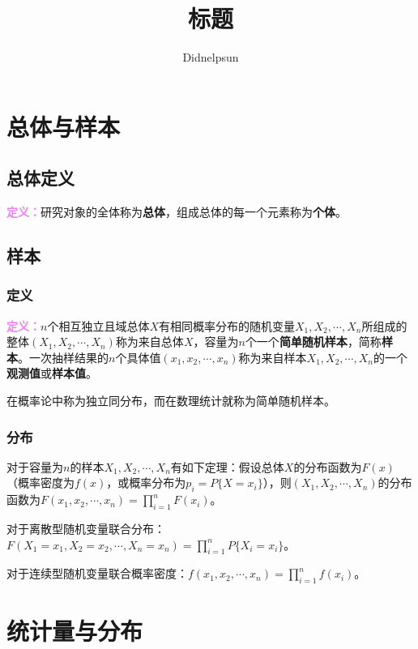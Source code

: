 \documentclass[UTF8, 12pt]{ctexart}
\author{Didnelpsun}
\title{标题}
\date{}
\begin{document}
\maketitle
\pagestyle{empty}
\thispagestyle{empty}
\tableofcontents
\thispagestyle{empty}
\newpage
\pagestyle{plain}
\setcounter{page}{1}
\section{总体与样本}

\subsection{总体定义}

\textcolor{violet}{\textbf{定义：}}研究对象的全体称为\textbf{总体}，组成总体的每一个元素称为\textbf{个体}。

\subsection{样本}

\subsubsection{定义}

\textcolor{violet}{\textbf{定义：}}$n$个相互独立且域总体$X$有相同概率分布的随机变量$X_1,X_2,\cdots,X_n$所组成的整体$(X_1,X_2,\cdots,X_n)$称为来自总体$X$，容量为$n$个一个\textbf{简单随机样本}，简称\textbf{样本}。一次抽样结果的$n$个具体值$(x_1,x_2,\cdots,x_n)$称为来自样本$X_1,X_2,\cdots,X_n$的一个\textbf{观测值}或\textbf{样本值}。

在概率论中称为独立同分布，而在数理统计就称为简单随机样本。

\subsubsection{分布}

对于容量为$n$的样本$X_1,X_2,\cdots,X_n$有如下定理：假设总体$X$的分布函数为$F(x)$（概率密度为$f(x)$，或概率分布为$p_i=P\{X=x_i\}$），则$(X_1,X_2,\cdots,X_n)$的分布函数为$F(x_1,x_2,\cdots,x_n)=\prod\limits_{i=1}^nF(x_i)$。

对于离散型随机变量联合分布：$F(X_1=x_1,X_2=x_2,\cdots,X_n=x_n)=\prod\limits_{i=1}^nP\{X_i=x_i\}$。

对于连续型随机变量联合概率密度：$f(x_1,x_2,\cdots,x_n)=\prod\limits_{i=1}^nf(x_i)$。

\section{统计量与分布}
\end{document}
